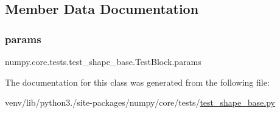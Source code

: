 \subsection{Member Data Documentation}
\mbox{\label{classnumpy_1_1core_1_1tests_1_1test__shape__base_1_1TestBlock_a9d6456ac4f7ed51b55b6a51657b62cde}} 
\subsubsection{\texorpdfstring{params}{params}}
{\footnotesize\ttfamily numpy.\+core.\+tests.\+test\+\_\+shape\+\_\+base.\+Test\+Block.\+params\hspace{0.3cm}{\ttfamily [static]}}



The documentation for this class was generated from the following file\+:\begin{DoxyCompactItemize}
\item 
venv/lib/python3./site-\/packages/numpy/core/tests/\hyperlink{core_2tests_2test__shape__base_8py}{test\+\_\+shape\+\_\+base.\+py}\end{DoxyCompactItemize}

